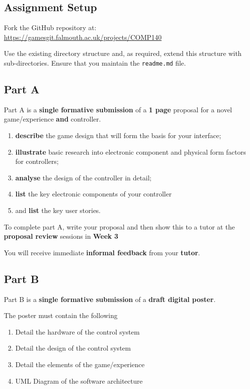 \documentclass{../../fal_assignment}
\begin{document}
	\subsection*{Assignment Setup}
	
	Fork the GitHub repository at:	
	\indent \url{https://gamesgit.falmouth.ac.uk/projects/COMP140}
	
	Use the existing directory structure and, as required, extend this structure with sub-directories. Ensure that you maintain the \texttt{readme.md} file.
	

\subsection*{Part A}

Part A is a \textbf{single formative submission} of a \textbf{1 page} proposal for a novel game/experience \textbf{and} controller.  

    \begin{enumerate}[label=\roman*.]
		\item \textbf{describe} the game design that will form the basis for your interface;
		\item \textbf{illustrate} basic research into electronic component and physical form factors for controllers;
		\item \textbf{analyse} the design of the controller in detail;
		\item \textbf{list} the key electronic components of your controller
		\item and \textbf{list} the key user stories.
	\end{enumerate}

To complete part A, write your proposal and then show this to a tutor at the \textbf{proposal review} sessions in \textbf{Week 3}

You will receive immediate \textbf{informal feedback} from your \textbf{tutor}.

\subsection*{Part B}

Part B is a \textbf{single formative submission} of a \textbf{draft digital poster}.

The poster must contain the following

\begin{enumerate}[label=\roman*.]
	\item Detail the hardware of the control system
	\item Detail the design of the control system
	\item Detail the elements of the game/experience
	\item UML Diagram of the software architecture
\end{enumerate}
\end{document}
